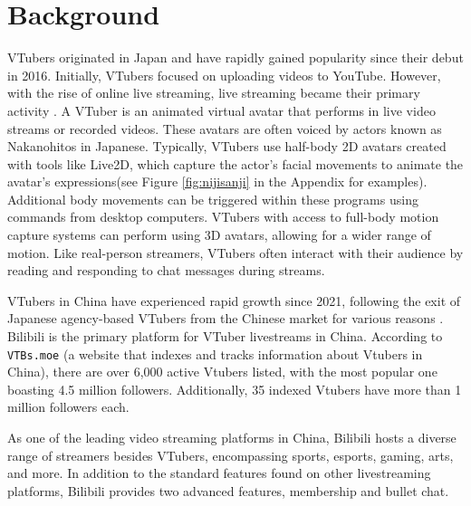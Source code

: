 \vspace{-2ex}
\section{Background}
\label{sec:back}


VTubers originated in Japan and have rapidly gained popularity since their debut in 2016. Initially, VTubers focused on uploading videos to YouTube. However, with the rise of online live streaming, live streaming became their primary activity \cite{10.1145/3604479.3604523}.
% 
A VTuber is an animated virtual avatar that performs in live video streams or recorded videos. These avatars are often voiced by actors known as Nakanohitos in Japanese. Typically, VTubers use half-body 2D avatars created with tools like Live2D, which capture the actor’s facial movements to animate the avatar’s expressions(see Figure \ref{fig:nijisanji} in the Appendix for examples). Additional body movements can be triggered within these programs using commands from desktop computers. VTubers with access to full-body motion capture systems can perform using 3D avatars, allowing for a wider range of motion. Like real-person streamers, VTubers often interact with their audience by reading and responding to chat messages during streams.



VTubers in China have experienced rapid growth since 2021, following the exit of Japanese agency-based VTubers from the Chinese market for various reasons \cite{holowiki}.
Bilibili is the primary platform for VTuber livestreams in China. According to \texttt{VTBs.moe} (a website that indexes and tracks information about Vtubers in China), there are over 6,000 active Vtubers listed, with the most popular one boasting 4.5 million followers. Additionally, 35 indexed Vtubers have more than 1 million followers each. 

As one of the leading video streaming platforms in China, Bilibili hosts a diverse range of streamers besides VTubers, encompassing sports, esports, gaming, arts, and more.
In addition to the standard features found on other livestreaming platforms, Bilibili provides two advanced features, membership and bullet chat.


